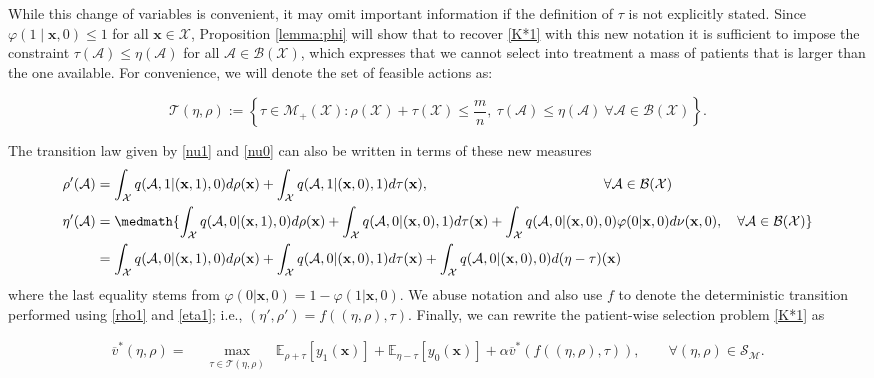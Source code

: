 \documentclass[12pt,a4paper]{article}
\newcommand{\bx}{\mathbf{x}}
\newcommand{\mA}{\mathcal{A}}
\newcommand{\mX}{\mathcal{X}}
\newcommand{\mS}{\mathcal{S}}
\newcommand{\mT}{\mathcal{T}}
\newcommand{\mM}{\mathcal{M}}
\newcommand{\mABX}{\mathcal{A} \in \mathcal{B}(\mathcal{X})}
\newcommand{\ov}{\overline{v}}
\begin{document}
While this change of variables is convenient, it may omit important information if the definition of $\tau$ is not explicitly stated. %
Since $\varphi(1 \mid \bx, 0) \leq 1$ for all $\bx \in \mathcal{X}$, Proposition \ref{lemma:phi} will show that to recover \eqref{K*1} with this new notation it is sufficient to impose the constraint
$\tau(\mA)\leq \eta(\mA)$ for all $\mABX$, which expresses that we cannot select into treatment a mass of patients that is larger than the one available. For convenience, we will denote the set of feasible actions as:

\begin{equation} \label{T_eta,rho}
   \mathcal{T}(\eta,\rho) := \left\{ \tau \in \mathcal{M}_+(\mathcal{X}) : \rho(\mathcal{X}) + \tau(\mathcal{X}) \leq \frac{m}{n}, \ \tau(\mathcal{A}) \leq \eta(\mathcal{A}) \ \forall \mathcal{A} \in \mathcal{B}(\mathcal{X}) \right\}. 
\end{equation}




The transition law given by \eqref{nu1} and \eqref{nu0} can also be written in terms of these new measures
	\begin{align}
		\rho'(\mA)&=\int_\mX  q(\mA,1 | (\bx,1),0) d\rho(\bx) + \int_\mX  q(\mA,1 | (\bx,0),1) d\tau(\bx), \qquad \qquad  \hspace{3cm}\forall \mABX  \label{rho1}\\
		\eta'(\mA)&=  \medmath{\int_\mX  q(\mA,0 | (\bx,1),0)  d\rho(\bx)+\int_\mX  q(\mA,0 | (\bx,0),1) d\tau(\bx)  +\int_\mX  q(\mA,0 | (\bx,0),0) \varphi(0|\bx,0) d\nu(\bx,0), \quad \forall \mABX}  \nonumber\\
		&=  \int_\mX  q(\mA,0 | (\bx,1),0)  d\rho(\bx)+\int_\mX  q(\mA,0 | (\bx,0),1) d\tau(\bx) +\int_\mX  q(\mA,0 | (\bx,0),0) d(\eta- \tau)(\bx) \label{eta1}
	\end{align}
	where the last equality stems from $\varphi(0|\bx,0)=1-\varphi(1|\bx,0)$. We abuse notation and also use $f$ to denote the deterministic transition performed using \eqref{rho1} and \eqref{eta1}; i.e., $(\eta',\rho')=f((\eta,\rho),\tau)$. Finally, we can rewrite the patient-wise selection problem \eqref{K*1} as
	
	\begin{align}\label{K*tau} \tag{K$^*_\tau$}
		\ov^*(\eta,\rho)=& \ \max_{\substack{\tau \in \mT(\eta,\rho)}} \ \mathbb{E}_{\rho+\tau}\left[ y_1(\bx) \right]     +\mathbb{E}_{\eta-\tau}\left[  y_0(\bx) \right]   + \alpha \ov^*(f((\eta,\rho),\tau)), \qquad \forall (\eta,\rho)\in \mS_\mM.
	\end{align}
\end{document}
